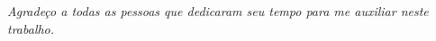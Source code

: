 \begin{center}
    \emph{
        Agradeço a todas as pessoas que dedicaram seu tempo para me auxiliar
        neste trabalho.
    }
\end{center}